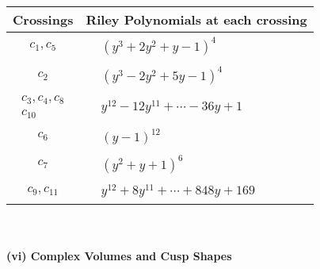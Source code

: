 \documentclass[1p]{elsarticle_modified}
\theoremstyle{definition}
\begin{document}
\begin{tabular}{m{50pt}|m{274pt}}
Crossings & \hspace{64pt}Riley Polynomials at each crossing \\
\hline $$\begin{aligned}c_{1},c_{5}\end{aligned}$$&$\begin{aligned}
&(y^3+2 y^2+y-1)^4
\end{aligned}$\\
\hline $$\begin{aligned}c_{2}\end{aligned}$$&$\begin{aligned}
&(y^3-2 y^2+5 y-1)^4
\end{aligned}$\\
\hline $$\begin{aligned}c_{3},c_{4},c_{8}\\c_{10}\end{aligned}$$&$\begin{aligned}
&y^{12}-12 y^{11}+\cdots-36 y+1
\end{aligned}$\\
\hline $$\begin{aligned}c_{6}\end{aligned}$$&$\begin{aligned}
&(y-1)^{12}
\end{aligned}$\\
\hline $$\begin{aligned}c_{7}\end{aligned}$$&$\begin{aligned}
&(y^2+y+1)^6
\end{aligned}$\\
\hline $$\begin{aligned}c_{9},c_{11}\end{aligned}$$&$\begin{aligned}
&y^{12}+8 y^{11}+\cdots+848 y+169
\end{aligned}$\\
\hline
\end{tabular}\\~\\
\newpage\flushleft \textbf{(vi) Complex Volumes and Cusp Shapes}
\end{document}
